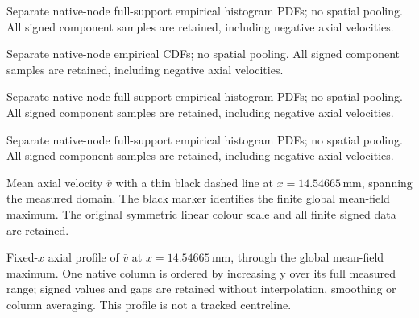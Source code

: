\caption{Separate native-node full-support empirical histogram PDFs; no spatial pooling. All signed component samples are retained, including negative axial velocities.}

\caption{Separate native-node empirical CDFs; no spatial pooling. All signed component samples are retained, including negative axial velocities.}

\caption{Separate native-node full-support empirical histogram PDFs; no spatial pooling. All signed component samples are retained, including negative axial velocities.}

\caption{Separate native-node full-support empirical histogram PDFs; no spatial pooling. All signed component samples are retained, including negative axial velocities.}

\caption{Mean axial velocity $\overline{v}$ with a thin black dashed line at $x=14.54665\,\mathrm{mm}$, spanning the measured domain. The black marker identifies the finite global mean-field maximum. The original symmetric linear colour scale and all finite signed data are retained.}

\caption{Fixed-$x$ axial profile of $\overline{v}$ at $x=14.54665\,\mathrm{mm}$, through the global mean-field maximum. One native column is ordered by increasing y over its full measured range; signed values and gaps are retained without interpolation, smoothing or column averaging. This profile is not a tracked centreline.}

